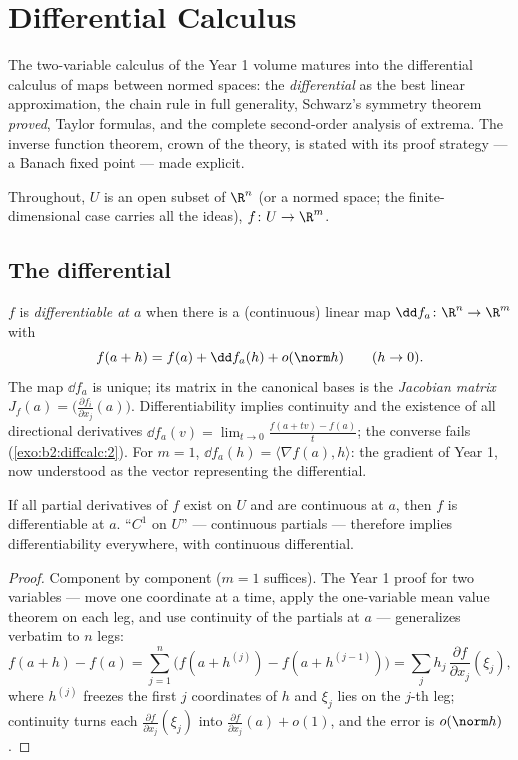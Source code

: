 \chapter{Differential Calculus}\label{ch:b2:diffcalc}

The two-variable calculus of the Year 1 volume matures into the
differential calculus of maps between normed spaces: the
\emph{differential} as the best linear approximation, the chain rule
in full generality, Schwarz's symmetry theorem \emph{proved}, Taylor
formulas, and the complete second-order analysis of extrema. The
inverse function theorem, crown of the theory, is stated with its
proof strategy --- a Banach fixed point --- made explicit.

Throughout, $U$ is an open subset of $\R^n$ (or a normed space; the
finite-dimensional case carries all the ideas), $f \colon U \to
\R^m$.

\section{The differential}

\begin{definition}\label{def:b2:diffcalc:differential}
$f$ is \emph{differentiable at $a$} when there
is a (continuous) linear map $\dd f_a \colon \R^n \to \R^m$ with
\[
f(a + h) = f(a) + \dd f_a(h) + o(\norm h)
\qquad (h \to 0).
\]
The map $\dd f_a$ is unique; its matrix in the canonical bases is
the \emph{Jacobian matrix} $J_f(a) =
\bigl(\frac{\partial f_i}{\partial x_j}(a)\bigr)$.
Differentiability implies continuity and the existence of all
directional derivatives $\dd f_a(v) = \lim_{t\to0}\frac{f(a + tv)
- f(a)}{t}$; the converse fails
(\cref{exo:b2:diffcalc:2}). For $m = 1$, $\dd f_a(h) = \langle
\nabla f(a), h\rangle$: the gradient of Year 1, now understood as
the vector representing the differential.
\end{definition}

\begin{theorem}[$C^1$ criterion]\label{thm:b2:diffcalc:c1}
If all partial derivatives of $f$ exist on $U$ and are continuous
at $a$, then $f$ is differentiable at $a$. ``$C^1$ on $U$'' ---
continuous partials --- therefore implies differentiability
everywhere, with continuous differential.
\end{theorem}

\begin{proof}
Component by component ($m = 1$ suffices). The Year 1 proof for two
variables --- move one coordinate at a time, apply the one-variable
mean value theorem on each leg, and use continuity of the partials
at $a$ --- generalizes verbatim to $n$ legs:
\[
f(a + h) - f(a) = \sum_{j=1}^{n} \bigl(f(a + h^{(j)}) - f(a +
h^{(j-1)})\bigr)
= \sum_j h_j\,\frac{\partial f}{\partial x_j}(\xi_j),
\]
where $h^{(j)}$ freezes the first $j$ coordinates of $h$ and
$\xi_j$ lies on the $j$-th leg; continuity turns each
$\frac{\partial f}{\partial x_j}(\xi_j)$ into $\frac{\partial
f}{\partial x_j}(a) + o(1)$, and the error is $o(\norm h)$.
\end{proof}

